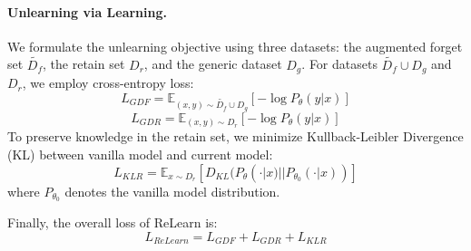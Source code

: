 \paragraph{Unlearning via Learning.}
We formulate the unlearning objective using three datasets: 
the augmented forget set $\tilde{D_f}$, the retain set $D_r$, and the generic dataset $D_g$.
For datasets $\tilde{D_f} \cup D_g$ and $D_r$, we employ cross-entropy loss:
\begin{equation}
  L_{GDF} = \mathbb{E}_{(x,y) \sim \tilde{D_f} \cup D_g}[-\log P_{\theta}(y|x)]
\end{equation}
\begin{equation}
  L_{GDR} = \mathbb{E}_{(x,y) \sim D_r}[-\log P_{\theta}(y|x)]
\end{equation}
To preserve knowledge in the retain set, we minimize Kullback-Leibler Divergence (KL) between vanilla model and current model:
\begin{equation}
  L_{KLR} = \mathbb{E}_{x \sim D_r}[D_{KL}(P_{\theta}(\cdot|x) || P_{\theta_0}(\cdot|x))]
\end{equation}
where $P_{\theta_0}$ denotes the vanilla model distribution.

Finally, the overall loss of ReLearn is:
\begin{equation}
  L_{ReLearn} = L_{GDF} + L_{GDR} + L_{KLR}
\end{equation}